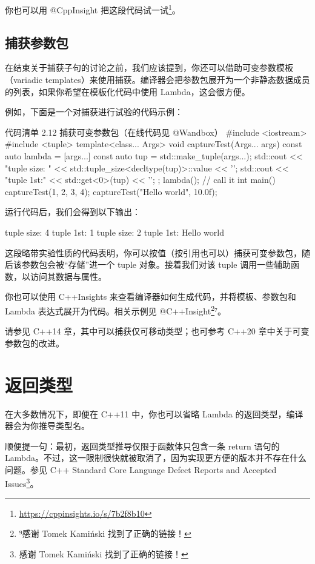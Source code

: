 \begin{codebox}
你也可以用 @CppInsight 把这段代码试一试\footnote{\url{https://cppinsights.io/s/7b2f8b10}}。

\subsection{捕获参数包}

在结束关于捕获子句的讨论之前，我们应该提到，你还可以借助可变参数模板（variadic templates）来使用捕获。编译器会把参数包展开为一个非静态数据成员的列表，如果你希望在模板化代码中使用 Lambda，这会很方便。

例如，下面是一个对捕获进行试验的代码示例：

\begin{codeboxt}{代码清单 2.12 捕获可变参数包（在线代码见 @Wandbox）}
#include <iostream>
#include <tuple>
template<class... Args>
void captureTest(Args... args) {
const auto lambda = [args...] {
const auto tup = std::make_tuple(args...);
std::cout << "tuple size: " <<
std::tuple_size<decltype(tup)>::value << '\n';
std::cout << "tuple 1st:\n" << std::get<0>(tup) << '\n';
};
lambda(); // call it
}
int main() {
captureTest(1, 2, 3, 4);
captureTest("Hello world", 10.0f);
}
\end{codeboxt}

运行代码后，我们会得到以下输出：

\begin{codebox}
tuple size: 4
tuple 1st:
1
tuple size: 2
tuple 1st:
Hello world
\end{codebox}

这段略带实验性质的代码表明，你可以按值（按引用也可以）捕获可变参数包，随后该参数包会被“存储”进一个 tuple 对象。接着我们对该 tuple 调用一些辅助函数，以访问其数据与属性。

你也可以使用 C++Insights 来查看编译器如何生成代码，并将模板、参数包和 Lambda 表达式展开为代码。相关示例见 @C++Insight\footnote{⁹感谢 Tomek Kamiński 找到了正确的链接！}⁷。


请参见 C++14 章，其中可以捕获仅可移动类型；也可参考 C++20 章中关于可变参数包的改进。

\section{返回类型}

在大多数情况下，即便在 C++11 中，你也可以省略 Lambda 的返回类型，编译器会为你推导类型名。

顺便提一句：最初，返回类型推导仅限于函数体只包含一条 return 语句的 Lambda。不过，这一限制很快就被取消了，因为实现更方便的版本并不存在什么问题。参见 C++ Standard Core Language Defect Reports and Accepted Issues\footnote{感谢 Tomek Kamiński 找到了正确的链接！}。


\end{codebox}

